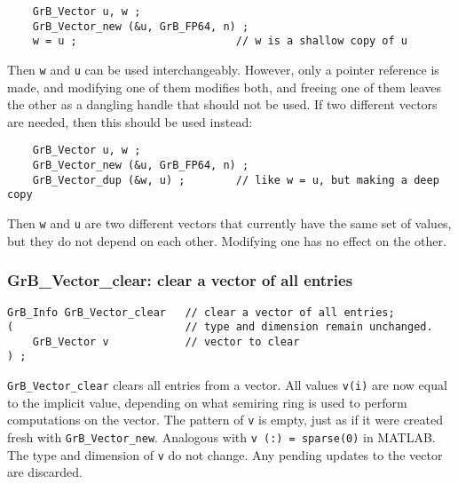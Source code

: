 \documentclass[12pt]{article}
\begin{document}
    {\footnotesize
    \begin{verbatim}
    GrB_Vector u, w ;
    GrB_Vector_new (&u, GrB_FP64, n) ;
    w = u ;                         // w is a shallow copy of u  \end{verbatim}}

Then \verb'w' and \verb'u' can be used interchangeably.  However, only a pointer
reference is made, and modifying one of them modifies both, and freeing one of
them leaves the other as a dangling handle that should not be used.
If two different vectors are needed, then this should be used instead:

    {\footnotesize
    \begin{verbatim}
    GrB_Vector u, w ;
    GrB_Vector_new (&u, GrB_FP64, n) ;
    GrB_Vector_dup (&w, u) ;        // like w = u, but making a deep copy \end{verbatim}}

Then \verb'w' and \verb'u' are two different vectors that currently have the
same set of values, but they do not depend on each other.  Modifying one has
no effect on the other.

\subsubsection{{\sf GrB\_Vector\_clear:}         clear a vector of all entries}
\label{vector_clear}

\begin{mdframed}[userdefinedwidth=6in]
{\footnotesize
\begin{verbatim}
GrB_Info GrB_Vector_clear   // clear a vector of all entries;
(                           // type and dimension remain unchanged.
    GrB_Vector v            // vector to clear
) ;
\end{verbatim}
} \end{mdframed}

\verb'GrB_Vector_clear' clears all entries from a vector.  All values
\verb'v(i)' are now equal to the implicit value, depending on what semiring
ring is used to perform computations on the vector.  The pattern of \verb'v' is
empty, just as if it were created fresh with \verb'GrB_Vector_new'.  Analogous
with \verb'v (:) = sparse(0)' in MATLAB.  The type and dimension of \verb'v' do
not change.  Any pending updates to the vector are discarded.
\end{document}
